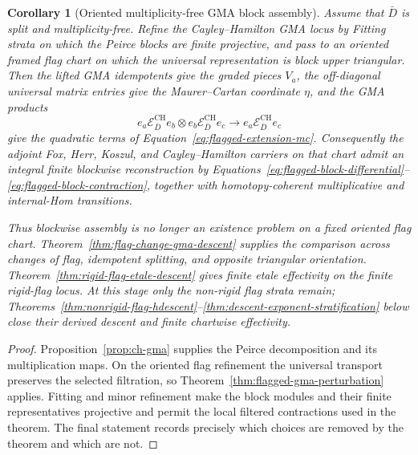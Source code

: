\documentclass[11pt]{article}
\newtheorem{corollary}[theorem]{Corollary}
\theoremstyle{definition}
\begin{document}
\begin{corollary}[Oriented multiplicity-free GMA block assembly]\label{cor:oriented-gma-block-assembly}
Assume that $\bar D$ is split and multiplicity-free.  Refine the Cayley--Hamilton GMA locus by Fitting strata on which the Peirce blocks are finite projective, and pass to an oriented framed flag chart on which the universal representation is block upper triangular.  Then the lifted GMA idempotents give the graded pieces $V_a$, the off-diagonal universal matrix entries give the Maurer--Cartan coordinate $\eta$, and the GMA products
\[
e_a\mathcal E^{\mathrm{CH}}_{\bar D}e_b
\otimes
e_b\mathcal E^{\mathrm{CH}}_{\bar D}e_c
\longrightarrow
e_a\mathcal E^{\mathrm{CH}}_{\bar D}e_c
\]
give the quadratic terms of Equation~\eqref{eq:flagged-extension-mc}.  Consequently the adjoint Fox, Herr, Koszul, and Cayley--Hamilton carriers on that chart admit an integral finite blockwise reconstruction by Equations~\eqref{eq:flagged-block-differential}--\eqref{eq:flagged-block-contraction}, together with homotopy-coherent multiplicative and internal-Hom transitions.

Thus blockwise assembly is no longer an existence problem on a fixed oriented flag chart.  Theorem~\ref{thm:flag-change-gma-descent} supplies the comparison across changes of flag, idempotent splitting, and opposite triangular orientation.  Theorem~\ref{thm:rigid-flag-etale-descent} gives finite etale effectivity on the finite rigid-flag locus.  At this stage only the non-rigid flag strata remain; Theorems~\ref{thm:nonrigid-flag-hdescent}--\ref{thm:descent-exponent-stratification} below close their derived descent and finite chartwise effectivity.
\end{corollary}

\begin{proof}
Proposition~\ref{prop:ch-gma} supplies the Peirce decomposition and its multiplication maps.  On the oriented flag refinement the universal transport preserves the selected filtration, so Theorem~\ref{thm:flagged-gma-perturbation} applies.  Fitting and minor refinement make the block modules and their finite representatives projective and permit the local filtered contractions used in the theorem.  The final statement records precisely which choices are removed by the theorem and which are not.
\end{proof}
\end{document}
